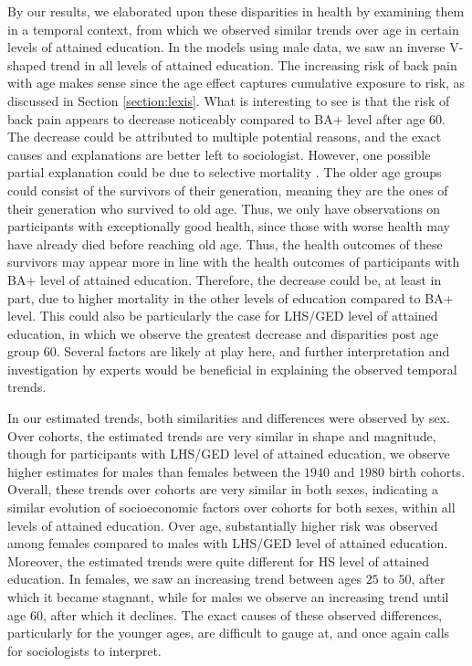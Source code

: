 \vspace{-0.2cm}
By our results, we elaborated upon these disparities in health by examining them in a temporal context, from which we observed similar trends over age in certain levels of attained education. In the models using male data, we saw an inverse V-shaped trend in all levels of attained education. The increasing risk of back pain with age makes sense since the age effect captures cumulative exposure to risk, as discussed in Section \ref{section:lexis}. What is interesting to see is that the risk of back pain appears to decrease noticeably compared to BA+ level after age $60$. The decrease could be attributed to multiple potential reasons, and the exact causes and explanations are better left to sociologist. However, one possible partial explanation could be due to selective mortality \citep{beckett2000converging, house1990age, lynch2003cohort}. The older age groups could consist of the survivors of their generation, meaning they are the ones of their generation who survived to old age. Thus, we only have observations on participants with exceptionally good health, since those with worse health may have already died before reaching old age. Thus, the health outcomes of these survivors may appear more in line with the health outcomes of participants with BA+ level of attained education. Therefore, the decrease could be, at least in part, due to higher mortality in the other levels of education compared to BA+ level. This could also be particularly the case for LHS/GED level of attained education, in which we observe the greatest decrease and disparities post age group $60$. Several factors are likely at play here, and further interpretation and investigation by experts would be beneficial in explaining the observed temporal trends.

\vspace{-0.2cm}
In our estimated trends, both similarities and differences were observed by sex. Over cohorts, the estimated trends are very similar in shape and magnitude, though for participants with LHS/GED level of attained education, we observe higher estimates for males than females between the $1940$ and $1980$ birth cohorts. Overall, these trends over cohorts are very similar in both sexes, indicating a similar evolution of socioeconomic factors over cohorts for both sexes, within all levels of attained education. Over age, substantially higher risk was observed among females compared to males with LHS/GED level of attained education. Moreover, the estimated trends were quite different for HS level of attained education. In females, we saw an increasing trend between ages $25$ to $50$, after which it became stagnant, while for males we observe an increasing trend until age $60$, after which it declines. The exact causes of these observed differences, particularly for the younger ages, are difficult to gauge at, and once again calls for sociologists to interpret.


